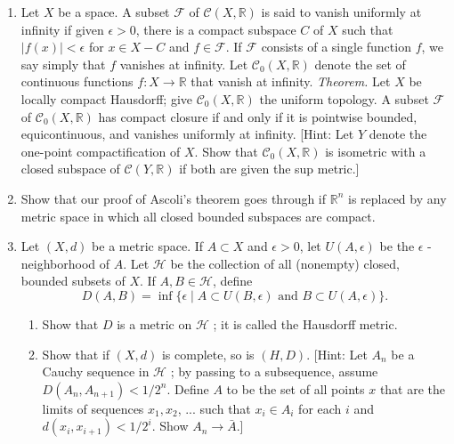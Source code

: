 \begin{enumerate}[itemsep=0.4em, parsep=0pt, topsep=0pt, partopsep=0pt, leftmargin=*, label=\arabic*., ref=\arabic*]
\begin{enumerate}[itemsep=0.2em, parsep=0pt, topsep=0pt, partopsep=0pt, leftmargin=*, label=(\alph*), align=left]
 \item Repeat (a) for the functions \(f_{n}\) of Exercise 9 of \S\ 21.
 \end{enumerate}
\item Let \(X\) be a space. A subset \(\mathcal{F}\) of \(\mathcal{C}({X,\mathbb{R}})\) is said to vanish uniformly at infinity if given \(\epsilon > 0\), there is a compact subspace \(C\) of \(X\) such that \(| {f(x) }| < \epsilon\) for \(x \in X - C\) and \(f \in \mathcal{F}\). If \(\mathcal{F}\) consists of a single function \(f\), we say simply that \(f\) vanishes at infinity. Let \(\mathcal{C}_{0}({X,\mathbb{R}})\) denote the set of continuous functions \(f : X \rightarrow \mathbb{R}\) that vanish at infinity. \textsl{Theorem.} Let \(X\) be locally compact Hausdorff; give \(\mathcal{C}_{0}({X,\mathbb{R}})\) the uniform topology. A subset \(\mathcal{F}\) of \(\mathcal{C}_{0}({X,\mathbb{R}})\) has compact closure if and only if it is pointwise bounded, equicontinuous, and vanishes uniformly at infinity. [Hint: Let \(Y\) denote the one-point compactification of \(X\). Show that \(\mathcal{C}_{0}({X,\mathbb{R}})\) is isometric with a closed subspace of \(\mathcal{C}({Y,\mathbb{R}})\) if both are given the sup metric.]
\item Show that our proof of Ascoli's theorem goes through if \(\mathbb{R}^{n}\) is replaced by any metric space in which all closed bounded subspaces are compact.
\item[*7.] Let \((X, d)\) be a metric space. If \(A \subset X\) and \(\epsilon > 0\), let \(U({A,\epsilon })\) be the \(\epsilon\) - neighborhood of \(A\). Let \(\mathcal{H}\) be the collection of all (nonempty) closed, bounded subsets of \(X\). If \(A,B \in \mathcal{H}\), define \[ D({A,B}) = \inf \{ \epsilon \mid A \subset U({B,\epsilon }) \text{ and }B \subset U({A,\epsilon }) \}. \]
 \begin{enumerate}[itemsep=0.2em, parsep=0pt, topsep=0pt, partopsep=0pt, leftmargin=*, label=(\alph*), align=left]
 \item Show that \(D\) is a metric on \(\mathcal{H}\) ; it is called the Hausdorff metric.
 \item Show that if \((X, d)\) is complete, so is \((H, D)\). [Hint: Let \(A_{n}\) be a Cauchy sequence in \(\mathcal{H}\) ; by passing to a subsequence, assume \(D({A_{n},A_{n + 1}}) < 1/2^{n}\). Define \(A\) to be the set of all points \(x\) that are the limits of sequences \(x_{1},x_{2}\), ... such that \(x_{i} \in {A}_{i}\) for each \(i\) and \(d({x_{i},x_{i + 1}}) < 1/2^{i}\). Show \(A_{n} \rightarrow \bar{A}\).]

\end{enumerate}
\end{enumerate}
